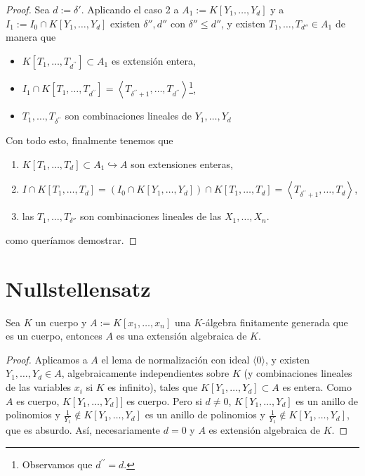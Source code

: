 \documentclass[../main.tex]{subfiles}
\begin{document}
\begin{proof}
Sea $d:=\delta'$. Aplicando el caso 2 a $A_{1}:=K\left[Y_{1}, \ldots, Y_{d}\right]$ y a $I_{1}:=I_{0} \cap K[Y_{1}, \ldots, Y_{d}]$ existen $\delta'', d''$ con $\delta'' \leq d''$, y existen $T_1, \dots, T_{d''} \in A_{1}$ de manera que
\begin{itemize}
  \item $K\left[T_{1}, \ldots, T_{d^{\prime \prime}}\right] \subset A_{1}$ es extensión entera,
  \item $I_{1} \cap K\left[T_{1}, \ldots, T_{d^{\prime \prime}}\right]=\left\langle T_{\delta^{\prime \prime}+1}, \ldots, T_{d^{\prime \prime}}\right\rangle$\footnote{Observamos que $d^{\prime \prime}=d$.},
  \item $T_{1}, \ldots, T_{\delta^{\prime \prime}}$ son combinaciones lineales de $Y_{1}, \ldots, Y_{d}$
\end{itemize}

Con todo esto, finalmente tenemos que
\begin{enumerate}
  \item  $K\left[T_{1}, \ldots, T_{d}\right] \subset A_{1} \hookrightarrow A$ son extensiones enteras,
  \item  $I \cap K\left[T_{1}, \ldots, T_{d}\right]=\left(I_{0} \cap K\left[Y_{1}, \ldots, Y_{d}\right]\right) \cap K\left[T_{1}, \ldots, T_{d}\right]=\left\langle T_{\delta^{\prime \prime}+1}, \ldots, T_{d}\right\rangle$,
  \item las $T_1, \dots, T_{\delta''}$ son combinaciones lineales de las $X_1, \dots, X_n$.
\end{enumerate}
como queríamos demostrar.
\end{proof}


\section{Nullstellensatz}
\begin{theorem}
	Sea $K$ un cuerpo y $A:=K[x_1,\dots,x_n]$ una $K$-álgebra finitamente generada que es un cuerpo, entonces $A$ es una extensión algebraica de $K.$
\end{theorem}

\begin{proof}Aplicamos a $A$ el lema de normalización con ideal $\langle 0\rangle$, y existen $Y_1,\dots,Y_d\in A$, algebraicamente independientes sobre $K$ (y combinaciones lineales de las variables $x_i$ si $K$ es infinito), tales que $K[Y_1,\dots,Y_d]\subset A$ es entera. Como $A$ es cuerpo, $K[Y_1,\dots,Y_d]]$ es cuerpo. Pero si $d\neq 0$, $K[Y_1,\dots,Y_d]$ es un anillo de polinomios y $\frac{1}{Y_1}\notin K[Y_1,\dots,Y_d]$ es un anillo de polinomios y $\frac{1}{Y_1}\notin K[Y_1,\dots,Y_d]$, que es absurdo. Así, necesariamente $d=0$ y $A$ es extensión algebraica de $K.$
\end{proof}
\end{document}
